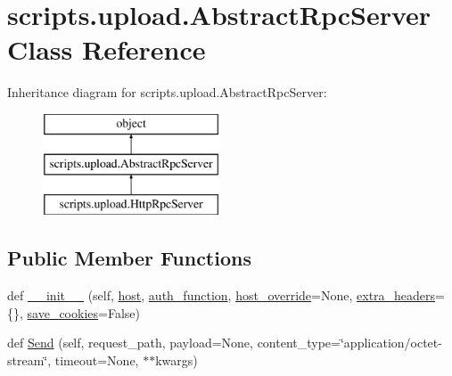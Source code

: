 \hypertarget{classscripts_1_1upload_1_1_abstract_rpc_server}{}\section{scripts.\+upload.\+Abstract\+Rpc\+Server Class Reference}
\label{classscripts_1_1upload_1_1_abstract_rpc_server}
Inheritance diagram for scripts.\+upload.\+Abstract\+Rpc\+Server\+:\begin{figure}[H]
\begin{center}
\leavevmode
\includegraphics[height=3.000000cm]{de/d9f/classscripts_1_1upload_1_1_abstract_rpc_server}
\end{center}
\end{figure}
\subsection*{Public Member Functions}
\begin{DoxyCompactItemize}
\item 
def \mbox{\hyperlink{classscripts_1_1upload_1_1_abstract_rpc_server_afac39d1c463d3595ccfbbe0aabd47aa9}{\+\_\+\+\_\+init\+\_\+\+\_\+}} (self, \mbox{\hyperlink{classscripts_1_1upload_1_1_abstract_rpc_server_a6fef92fa84d52713fd980ca506ac255e}{host}}, \mbox{\hyperlink{classscripts_1_1upload_1_1_abstract_rpc_server_a994e096aae3befc19a171e4a530efe3f}{auth\+\_\+function}}, \mbox{\hyperlink{classscripts_1_1upload_1_1_abstract_rpc_server_a33fb1cd5668d8600539924b63e377c03}{host\+\_\+override}}=None, \mbox{\hyperlink{classscripts_1_1upload_1_1_abstract_rpc_server_a13536647deef2dd102ea6a909bbe82bd}{extra\+\_\+headers}}=\{\}, \mbox{\hyperlink{classscripts_1_1upload_1_1_abstract_rpc_server_a1012fa8f90f4b5eed66f83a1d6a08b7c}{save\+\_\+cookies}}=False)
\item 
def \mbox{\hyperlink{classscripts_1_1upload_1_1_abstract_rpc_server_ae5ceef254ccc39b0b7d30eb0a3d2d465}{Send}} (self, request\+\_\+path, payload=None, content\+\_\+type=\char`\"{}application/octet-\/stream\char`\"{}, timeout=None, $\ast$$\ast$kwargs)
\end{DoxyCompactItemize}
